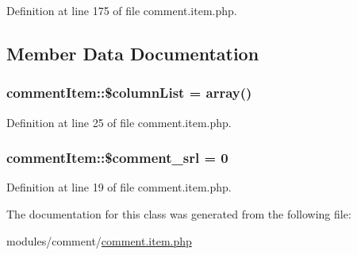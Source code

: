 Definition at line 175 of file comment.\+item.\+php.



\subsection{Member Data Documentation}
\hypertarget{classcommentItem_ad9849e9711f1458b25cf7775336bd6cd}{}
\subsubsection[{\$column\+List}]{\setlength{\rightskip}{0pt plus 5cm}comment\+Item\+::\$column\+List = array()}\label{classcommentItem_ad9849e9711f1458b25cf7775336bd6cd}


Definition at line 25 of file comment.\+item.\+php.

\hypertarget{classcommentItem_aec6b057a6e1e71a7b1441fe12682af3b}{}
\subsubsection[{\$comment\+\_\+srl}]{\setlength{\rightskip}{0pt plus 5cm}comment\+Item\+::\$comment\+\_\+srl = 0}\label{classcommentItem_aec6b057a6e1e71a7b1441fe12682af3b}


Definition at line 19 of file comment.\+item.\+php.



The documentation for this class was generated from the following file\+:\begin{DoxyCompactItemize}
\item 
modules/comment/\hyperlink{comment_8item_8php}{comment.\+item.\+php}\end{DoxyCompactItemize}
